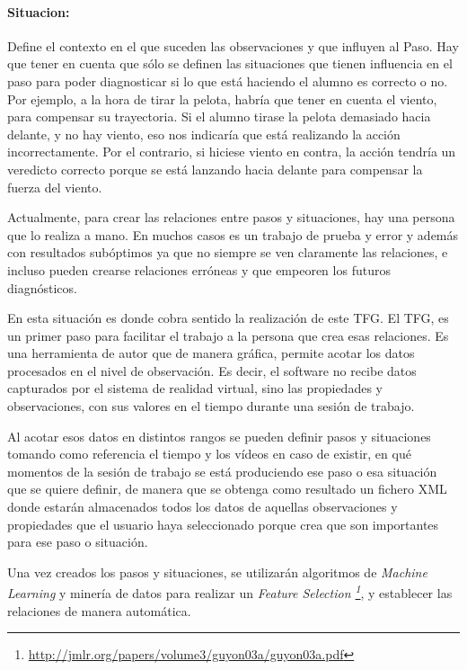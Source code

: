 \paragraph{\textbf{Situacion:}}
Define el contexto en el que suceden las observaciones y que influyen al Paso. Hay que
tener en cuenta que s\'olo se definen las situaciones que tienen influencia en el paso
para poder diagnosticar si lo que est\'a haciendo el alumno es correcto o no. Por ejemplo, a la hora
de tirar la pelota, habr\'ia que tener en cuenta el viento, para compensar su trayectoria. Si el alumno
tirase la pelota demasiado hacia delante, y no hay viento, eso nos indicar\'ia que est\'a realizando la acci\'on
incorrectamente. Por el contrario, si hiciese viento en contra, la acci\'on tendr\'ia un veredicto correcto
porque se est\'a lanzando hacia delante para compensar la fuerza del viento.

Actualmente, para crear las relaciones entre pasos y situaciones, hay una persona que lo realiza a mano. En muchos casos
es un trabajo de prueba y error y adem\'as con resultados sub\'optimos ya que no siempre se ven claramente las relaciones,
e incluso pueden crearse relaciones err\'oneas y que empeoren los futuros diagn\'osticos.

En esta situaci\'on es donde cobra sentido la realizaci\'on de este TFG. El TFG, es un primer paso para facilitar
el trabajo a la persona que crea esas relaciones. Es una herramienta de autor que de manera gr\'afica, permite
acotar los datos procesados en el nivel de observaci\'on. Es decir, el software no recibe datos capturados por
el sistema de realidad virtual, sino
las propiedades y observaciones, con sus valores en el tiempo durante una sesi\'on de trabajo.

Al acotar esos datos en distintos rangos se pueden definir pasos y situaciones tomando como referencia
el tiempo y los v\'ideos en caso de existir, en qu\'e momentos de la sesi\'on de trabajo
se est\'a produciendo ese paso o esa situaci\'on que se quiere definir, de manera que se obtenga
como resultado un fichero XML donde estar\'an almacenados todos los datos de aquellas observaciones y 
propiedades que el usuario haya seleccionado porque crea que son importantes para ese paso o 
situaci\'on.

Una vez creados los pasos y situaciones, se utilizar\'an algoritmos de \emph{Machine Learning} 
y miner\'ia de datos para
realizar un \emph{Feature Selection 
\footnote{\url{http://jmlr.org/papers/volume3/guyon03a/guyon03a.pdf}}},
y establecer las relaciones de manera autom\'atica.

